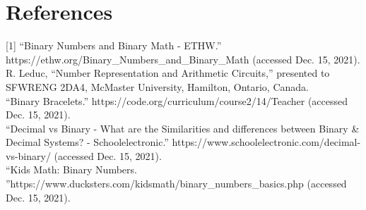 \documentclass[twocolumn, 10pt]{article}
\begin{document}
\section{References}
[1] “Binary Numbers and Binary Math - ETHW.” https://ethw.org/Binary\_Numbers\_and\_Binary\_Math (accessed Dec. 15, 2021). \\
\newline
[2] R. Leduc, “Number Representation and Arithmetic Circuits,” presented to SFWRENG 2DA4, McMaster University, Hamilton, Ontario, Canada. \\
\newline
[3] “Binary Bracelets.” https://code.org/curriculum/course2/14/Teacher (accessed Dec. 15, 2021).\\
\newline
[4]“Decimal vs Binary - What are the Similarities and differences between Binary \& Decimal Systems? - Schoolelectronic.” https://www.schoolelectronic.com/decimal-vs-binary/ (accessed Dec. 15, 2021). \\
\newline
[5] “Kids Math: Binary Numbers. ”https://www.ducksters.com/kidsmath/binary\_numbers\_basics.php (accessed Dec. 15, 2021).
\end{document}
